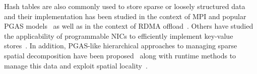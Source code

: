 Hash tables are also commonly used to store sparse or loosely structured
data~\cite{memcached04,chord01,docan:12} and their implementation has been
studied in the context of MPI and popular PGAS
models~\cite{zht13,fompi13,cmpi10,maynard:12,memcached12,mht15} as well as in
the context of RDMA offload~\cite{memcached12,mitchell:13,kalia:14}.  Others
have studied the applicability of programmable NICs to efficiently implement
key-value stores~\cite{li:17}.  In addition, PGAS-like hierarchical approaches
to managing sparse spatial decomposition have been proposed~\cite{larkins:08}
along with runtime methods to manage this data and exploit spatial
locality~\cite{larkins:12}.


